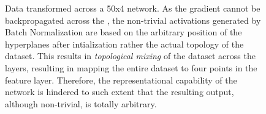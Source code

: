\begin{figure}
{{    %
    }
    \parbox{.195\textwidth}{%
    }
  }
  \caption{Data transformed across a 50x4 \ReLUBN network. As the gradient cannot be backpropagated across the \ReLU, the non-trivial activations generated by Batch Normalization are based on the arbitrary position of the hyperplanes after intialization rather the actual topology of the dataset. This results in \emph{topological mixing} of the dataset across the layers, resulting in mapping the entire dataset to four points in the feature layer. Therefore, the representational capability of the network is hindered to such extent that the resulting output, although non-trivial, is totally arbitrary.}
    \label{fig:moonsReLUBN}
\end{figure}





